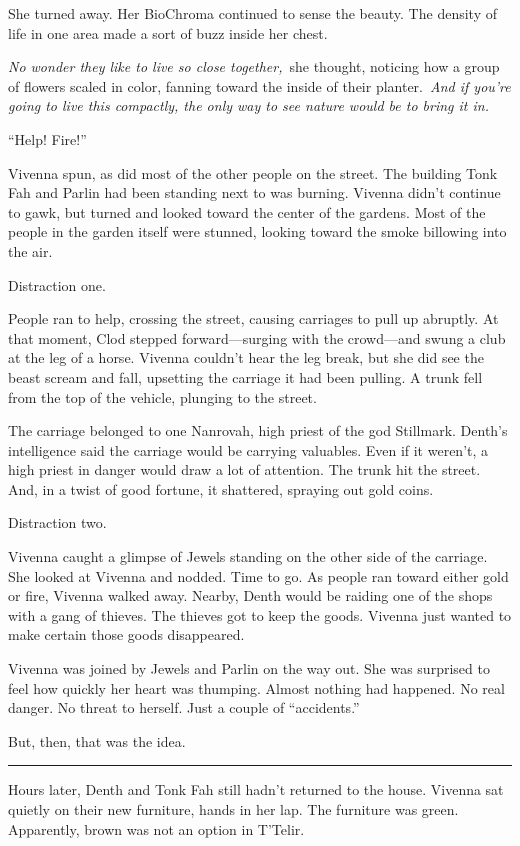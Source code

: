 She turned away. Her BioChroma continued to sense the beauty. The density of life in one area made a sort of buzz inside her chest.

\textit{No wonder they like to live so close together,}~she thought, noticing how a group of flowers scaled in color, fanning toward the inside of their planter.~\textit{And if you’re going to live this compactly, the only way to see nature would be to bring it in.}

“Help! Fire!”

Vivenna spun, as did most of the other people on the street. The building Tonk Fah and Parlin had been standing next to was burning. Vivenna didn’t continue to gawk, but turned and looked toward the center of the gardens. Most of the people in the garden itself were stunned, looking toward the smoke billowing into the air.

Distraction one.

People ran to help, crossing the street, causing carriages to pull up abruptly. At that moment, Clod stepped forward—surging with the crowd—and swung a club at the leg of a horse. Vivenna couldn’t hear the leg break, but she did see the beast scream and fall, upsetting the carriage it had been pulling. A trunk fell from the top of the vehicle, plunging to the street.

The carriage belonged to one Nanrovah, high priest of the god Stillmark. Denth’s intelligence said the carriage would be carrying valuables. Even if it weren’t, a high priest in danger would draw a lot of attention. The trunk hit the street. And, in a twist of good fortune, it shattered, spraying out gold coins.

Distraction two.

Vivenna caught a glimpse of Jewels standing on the other side of the carriage. She looked at Vivenna and nodded. Time to go. As people ran toward either gold or fire, Vivenna walked away. Nearby, Denth would be raiding one of the shops with a gang of thieves. The thieves got to keep the goods. Vivenna just wanted to make certain those goods disappeared.

Vivenna was joined by Jewels and Parlin on the way out. She was surprised to feel how quickly her heart was thumping. Almost nothing had happened. No real danger. No threat to herself. Just a couple of “accidents.”

But, then, that was the idea.

\bigskip \hrule \bigskip

Hours later, Denth and Tonk Fah still hadn’t returned to the house. Vivenna sat quietly on their new furniture, hands in her lap. The furniture was green. Apparently, brown was not an option in T’Telir.

